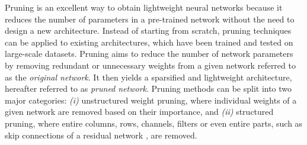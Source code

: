 

Pruning is an excellent way to obtain lightweight neural networks because it
reduces the number of parameters in a pre-trained network without the need to
design a new architecture. Instead of starting from scratch, pruning techniques
can be applied to existing architectures, which have been trained and tested on
large-scale datasets. Pruning aims to reduce the number of network parameters by
removing redundant or unnecessary weights from a given network referred to as
the \textit{original network}. It then yields a sparsified and lightweight
architecture, hereafter referred to as \textit{pruned network}. Pruning methods
can be split into two major categories: \textit{(i)} unstructured weight
pruning, where individual weights of a given network are removed based on their
importance, and \textit{(ii)} structured pruning, where entire columns, rows,
channels, filters or even entire parts, such as skip connections of a residual
network \cite{DBLP:conf/cvpr/HeZRS16}, are removed. \\

